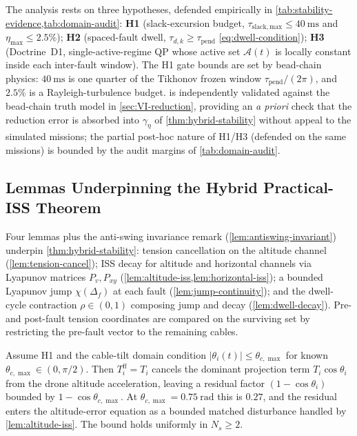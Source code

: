 The analysis rests on three hypotheses, defended empirically in \cref{tab:stability-evidence,tab:domain-audit}: \textbf{H1} (slack-excursion budget, $\tau_{\mathrm{slack,max}}\le\SI{40}{\milli\second}$ and $\eta_{\max}\le 2.5\%$); \textbf{H2} (spaced-fault dwell, $\tau_{d,k}\ge\tau_{\mathrm{pend}}$ \eqref{eq:dwell-condition}); \textbf{H3} (Doctrine~D1, single-active-regime QP whose active set $\mathcal{A}(t)$ is locally constant inside each inter-fault window). The H1 gate bounds are set by bead-chain physics: $\SI{40}{\milli\second}$ is one quarter of the Tikhonov frozen window $\tau_{\mathrm{pend}}/(2\pi)$, and $2.5\%$ is a Rayleigh-turbulence budget.  is independently validated against the bead-chain truth model in \cref{sec:VI-reduction}, providing an \emph{a priori} check that the reduction error is absorbed into $\gamma_\eta$ of \cref{thm:hybrid-stability} without appeal to the simulated missions; the partial post-hoc nature of H1/H3 (defended on the same missions) is bounded by the audit margins of \cref{tab:domain-audit}.

\subsection{Lemmas Underpinning the Hybrid Practical-ISS Theorem}
\label{sec:five-lemmas}

Four lemmas plus the anti-swing invariance remark (\cref{lem:antiswing-invariant}) underpin \cref{thm:hybrid-stability}: tension cancellation on the altitude channel (\cref{lem:tension-cancel}); ISS decay for altitude and horizontal channels via Lyapunov matrices $P_v,P_{xy}$ (\cref{lem:altitude-iss,lem:horizontal-iss}); a bounded Lyapunov jump $\chi(\Delta_f)$ at each fault (\cref{lem:jump-continuity}); and the dwell-cycle contraction $\rho\in(0,1)$ composing jump and decay (\cref{lem:dwell-decay}). Pre- and post-fault tension coordinates are compared on the surviving set by restricting the pre-fault vector to the remaining cables.

\begin{lemma}
\label{lem:tension-cancel}
Assume H1 and the cable-tilt domain condition
$|\theta_i(t)| \le \theta_{c,\max}$ for known
$\theta_{c,\max} \in (0, \pi/2)$. Then
$T_i^{\mathrm{ff}} = T_i$ cancels the dominant projection term
$T_i\cos\theta_i$ from the drone altitude acceleration,
leaving a residual factor $(1 - \cos\theta_i)$ bounded by
$1 - \cos\theta_{c,\max}$. At $\theta_{c,\max} =
\SI{0.75}{\radian}$ this is $0.27$, and the residual enters the altitude-error equation as a bounded matched disturbance
handled by \cref{lem:altitude-iss}. The bound holds uniformly
in $N_s \ge 2$.
\end{lemma}

